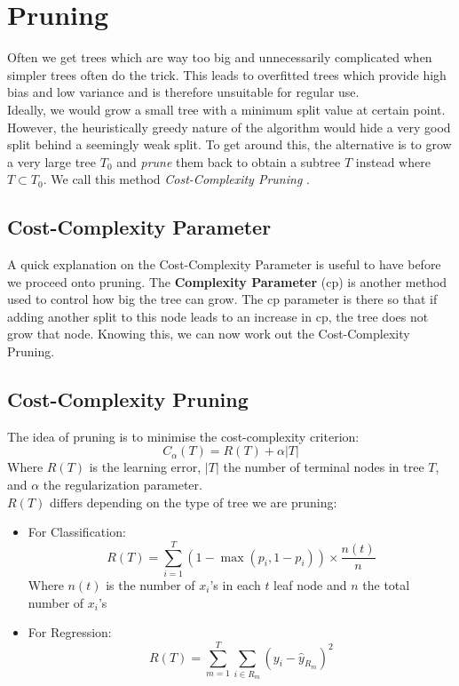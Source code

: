 \documentclass[11pt,a4paper]{report}
\begin{document}
\section{Pruning}
Often we get trees which are way too big and unnecessarily complicated when simpler trees often do the trick. 
This leads to overfitted trees which provide high bias and low variance and is therefore unsuitable for regular use.\\
Ideally, we would grow a small tree with a minimum split value at certain point.
However, the heuristically greedy nature of the algorithm would hide a very good split behind a seemingly weak split. 
To get around this, the alternative is to grow a very large tree $T_0$ and \textit{prune} them back to obtain a subtree $T$ instead where $T \subset T_0$.
We call this method \textit{Cost-Complexity Pruning} \cite{BreimanDT}.

\subsection{Cost-Complexity Parameter}
A quick explanation on the Cost-Complexity Parameter is useful to have before we proceed onto pruning.
The \textbf{Complexity Parameter} (cp) is another method used to control how big the tree can grow. 
The cp parameter is there so that if adding another split to this node leads to an increase in cp, the tree does not grow that node.
Knowing this, we can now work out the Cost-Complexity Pruning.

\subsection{Cost-Complexity Pruning}
The idea of pruning is to minimise the cost-complexity criterion:
\begin{equation}
    C_{\alpha} (T) = R(T) + \alpha \left|T\right|
    \label{eq:prune}
\end{equation}
Where $R(T)$ is the learning error, $\left|T\right|$ the number of terminal nodes in tree $T$, and $\alpha$ the regularization parameter.\\
$R(T)$ differs depending on the type of tree we are pruning:
\begin{itemize}
    \item For Classification: 
    \[ R(T) = \sum_{i = 1}^{T} (1 - \max (p_i, 1 - p_i)) \times \frac{n(t)}{n} \]
    Where $n(t)$ is the number of $x_i$'s in each $t$ leaf node and $n$ the total number of $x_i$'s
    
    \item For Regression:
    \[ R(T) = \sum_{m=1}^{T} \sum_{i \in R_m} (y_i - \hat{y}_{R_m})^2 \]
\end{itemize}
\end{document}
